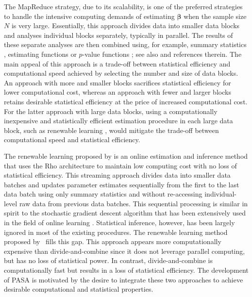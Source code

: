 \documentclass[12pt]{article}
\newcommand{\bbeta}{\boldsymbol{\beta}}
\begin{document}
The MapReduce strategy, due to its scalability, is one of the preferred strategies to handle the intensive computing demands of estimating $\bbeta$ when the sample size $N$ is very large. Essentially, this approach divides data into smaller data blocks and analyses individual blocks separately, typically in parallel. The results of these separate analyses are then combined using, for example, summary statistics \cite{Glass}, estimating functions \cite{Hansen} or $p$-value functions \cite{Xie-Singh-Strawderman}; see also \cite{Zellner, Jordan, Wang-Wang-Song-2012, Tang-Song} and references therein. The main appeal of this approach is a trade-off between statistical efficiency and computational speed achieved by selecting the number and size of data blocks. An approach with more and smaller blocks sacrifices statistical efficiency for lower computational cost, whereas an approach with fewer and larger blocks retains desirable statistical efficiency at the price of increased computational cost. For the latter approach with large data blocks, using a computationally inexpensive and statistically efficient estimation procedure in each large data block, such as renewable learning \cite{Luo-Song-2020}, would mitigate the trade-off between computational speed and statistical efficiency.

The renewable learning proposed by \cite{Luo-Song-2020} is an online estimation and inference method that uses the Rho architecture to maintain low computing cost with no loss of statistical efficiency. This streaming approach divides data into smaller data batches and updates parameter estimates sequentially from the first to the last data batch using only summary statistics and without re-accessing individual-level raw data from previous data batches. This sequential processing is similar in spirit to the stochastic gradient descent algorithm that has been extensively used in the field of online learning \cite{Robbins1951,Sakrison1965,Toulis2015MLE}. Statistical inference, however, has been largely ignored in most of the existing procedures. The renewable learning method proposed by~\cite{Luo-Song-2020} fills this gap. This approach appears more computationally expensive than divide-and-combine since it does not leverage parallel computing, but has no loss of statistical power. In contrast, divide-and-combine is computationally fast but results in a loss of statistical efficiency. The development of PASA is motivated by the desire to integrate these two approaches to achieve desirable computational and statistical properties.
\end{document}
